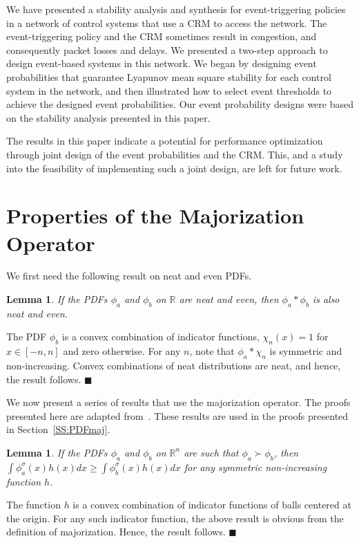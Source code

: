 \documentclass[twocolumn]{autart}
\newtheorem{lemma}[theorem]{Lemma}
\newenvironment{proof}[1][Proof]{\begin{trivlist}
\item[\hskip \labelsep {\bfseries #1}]}{\end{trivlist}}
\renewcommand{\qed}{$\blacksquare$}
\begin{document}
We have presented a stability analysis and synthesis for event-triggering policies in a network of control systems that use a CRM to access the network. The event-triggering policy and the CRM sometimes result in congestion, and consequently packet losses and delays. We presented a two-step approach to design event-based systems in this network. We began by designing event probabilities that guarantee Lyapunov mean square stability for each control system in the network, and then illustrated how to select event thresholds to achieve the designed event probabilities. Our event probability designs were based on the stability analysis presented in this paper.

The results in this paper indicate a potential for performance optimization through joint design of the event probabilities and the CRM. This, and a study into the feasibility of implementing such a joint design, are left for future work.






\appendix
\section{Properties of the Majorization Operator} \label{App:MajLemmas}

We first need the following result on neat and even PDFs.
\begin{lemma} \label{Lemma:SymmNIConv}
If the PDFs $\phi_a$ and $\phi_b$ on $\mathbb{R}$ are neat and even, then $\phi_a \ast \phi_b$ is also neat and even.
\end{lemma}
\begin{proof}
The PDF $\phi_b$ is a convex combination of indicator functions, $\chi_n(x) = 1$ for $x \in [-n,n]$ and zero otherwise. For any $n$, note that $\phi_a \ast \chi_n$ is symmetric and non-increasing. Convex combinations of neat distributions are neat, and hence, the result follows. \hfill \qed
\end{proof}

We now present a series of results that use the majorization operator. The proofs presented here are adapted from~\cite{Hajek2008}. These results are used in the proofs presented in Section~\ref{SS:PDFmaj}.
\begin{lemma} \label{Lemma:Maj1}
If the PDFs $\phi_a$ and $\phi_b$ on $\mathbb{R}^n$ are such that $\phi_a \succ \phi_b$, then $\int \phi_a^\sigma (x) h(x) dx \ge \int \phi_b^\sigma (x) h(x) dx$ for any symmetric non-increasing function $h$.
\end{lemma}
\begin{proof}
The function $h$ is a convex combination of indicator functions of balls centered at the origin. For any such indicator function, the above result is obvious from the definition of majorization. Hence, the result follows. \hfill \qed
\end{proof}
\end{document}
